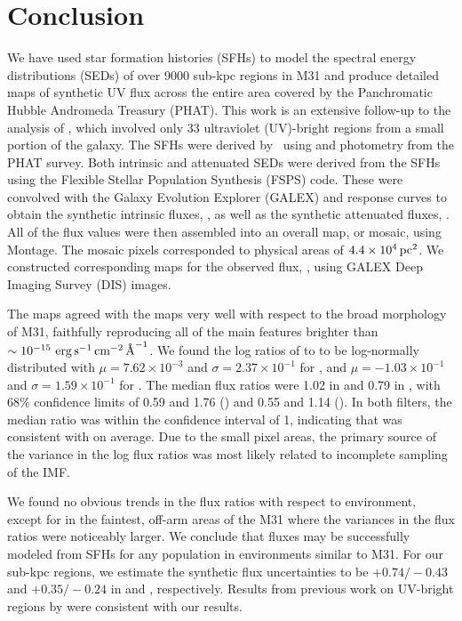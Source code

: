 \documentclass[iop, tighten]{emulateapj}
\begin{document}
\section{Conclusion}\label{mfx:conclusion}

We have used star formation histories (SFHs) to model the spectral energy
distributions (SEDs) of over 9000 sub-kpc regions in M31 and produce detailed
maps of synthetic UV flux across the entire area covered by the Panchromatic
Hubble Andromeda Treasury (PHAT). This work is an extensive follow-up to the
analysis of \citet{Simones:2014}, which involved only 33 ultraviolet
(UV)-bright regions from a small portion of the galaxy. The SFHs were derived
by \citet{Lewis:2014}\ using \acsb{} and \acsi{} photometry from the PHAT
survey. Both intrinsic and attenuated SEDs were derived from the SFHs using the
Flexible Stellar Population Synthesis (FSPS) code. These were convolved with
the Galaxy Evolution Explorer (GALEX) \fuv{} and \nuv{} response curves to
obtain the synthetic intrinsic fluxes, \fxsfhz{}, as well as the synthetic
attenuated fluxes, \fxsfh{}. All of the flux values were then assembled into an
overall map, or mosaic, using Montage. The mosaic pixels corresponded to
physical areas of $4.4\times 10^4\,\mathrm{pc}^2$. We constructed corresponding maps for
the observed flux, \fxobs{}, using GALEX Deep Imaging Survey (DIS) images.

The \fxsfh{} maps agreed with the \fxobs{} maps very well with respect to the
broad morphology of M31, faithfully reproducing all of the main features
brighter than $\sim 10^{-15}\, \,\mathrm{erg}\,\mathrm{s}^{-1}\,\mathrm{cm}^{-2}\,\textrm{\AA}^{-1}$. We found the log ratios of \fxsfh{} to
\fxobs{} to be log-normally distributed with $\mu = 7.62\times 10^{-3}$ and
$\sigma = 2.37\times 10^{-1}$ for \fuv{}, and $\mu = -1.03\times 10^{-1}$ and
$\sigma = 1.59\times 10^{-1}$ for \nuv{}. The median flux ratios were 1.02 in
\fuv{} and 0.79 in \nuv{}, with 68\% confidence limits of 0.59 and 1.76
(\fuv{}) and 0.55 and 1.14 (\nuv{}). In both filters, the median ratio was
within the confidence interval of 1, indicating that \fxsfh{} was consistent
with \fxobs{} on average. Due to the small pixel areas, the primary source of
the variance in the log flux ratios was most likely related to incomplete
sampling of the IMF.

We found no obvious trends in the flux ratios with respect to environment,
except for in the faintest, off-arm areas of the M31 where the variances in the
flux ratios were noticeably larger. We conclude that fluxes may be successfully
modeled from SFHs for any population in environments similar to M31. For our
sub-kpc regions, we estimate the synthetic flux uncertainties to be
$+\!0.74/\!-\!0.43$ and $+\!0.35/\!-\!0.24$ in \fuv{} and \nuv{}, respectively.
Results from previous work on UV-bright regions by \citet{Simones:2014} were
consistent with our results.
\end{document}
